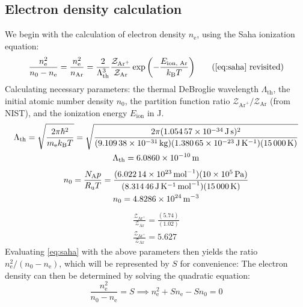         \subsection{Electron density calculation}
            We begin with the calculation of electron density $n_\mathrm{e}$, using the Saha ionization equation:
            \begin{equation*}
                \frac{n_\mathrm{e}^2}{n_0-n_\mathrm{e}} = \frac{n_\mathrm{e}^2}{n_\mathrm{Ar}} = \frac{2}{\Lambda_\mathrm{th}^3}\frac{\mathcal{Z}_{\mathrm{Ar}^+}}{\mathcal{Z}_\mathrm{Ar}}\exp{\left(-\frac{E_\text{ion, Ar}}{k_\mathrm{B}T}\right)}
                \tag{\ref{eq:saha} revisited}
            \end{equation*}
            Calculating necessary parameters: the thermal DeBroglie wavelength $\Lambda_\mathrm{th}$, the initial atomic number density $n_0$, the partition function ratio $\mathcal{Z}_{\mathrm{Ar}^+}/\mathcal{Z}_\mathrm{Ar}$ (from NIST), and the ionization energy $E_\text{ion}$ in J.
            \begin{multline*}
                \Lambda_\mathrm{th} = \sqrt{\frac{2\pi\hbar^2}{m_\mathrm{e}k_\mathrm{B}T}} = \sqrt{\frac{2\pi(\qty{1.05457e-34}{J.s})^2}{(\qty{9.10938e-31}{kg})(\qty{1.38065e-23}{J.K^{-1}})(\qty{15000}{K})}} \\
                \Lambda_\mathrm{th} = \qty{6.0860e-10}{m}
            \end{multline*}
            \begin{multline*}
                n_0 = \frac{N_\mathrm{A}p}{R_\mathrm{u}T} = \frac{(\qty{6.02214e+23}{mol^{-1}})(\qty{10e+5}{Pa})}{(\qty{8.31446}{J.K^{-1}.mol^{-1}})(\qty{15000}{K})} \\
                n_0 = \qty{4.8286e24}{m^{-3}}
            \end{multline*}
            \begin{multline*}
                \frac{\mathcal{Z}_{\mathrm{Ar}^+}}{\mathcal{Z}_\mathrm{Ar}} = \frac{(5.74)}{(1.02)} \\ 
                \frac{\mathcal{Z}_{\mathrm{Ar}^+}}{\mathcal{Z}_\mathrm{Ar}} = 5.627
            \end{multline*}
            Evaluating \autoref{eq:saha} with the above parameters then yields the ratio $n_\mathrm{e}^2/(n_0-n_\mathrm{e})$, which will be represented by $S$ for convenience:
            The electron density can then be determined by solving  the quadratic equation:
            \begin{equation*}
                \frac{n_\mathrm{e}^2}{n_0-n_\mathrm{e}} = S \implies n_\mathrm{e}^2+Sn_\mathrm{e}-Sn_0 = 0
            \end{equation*}

